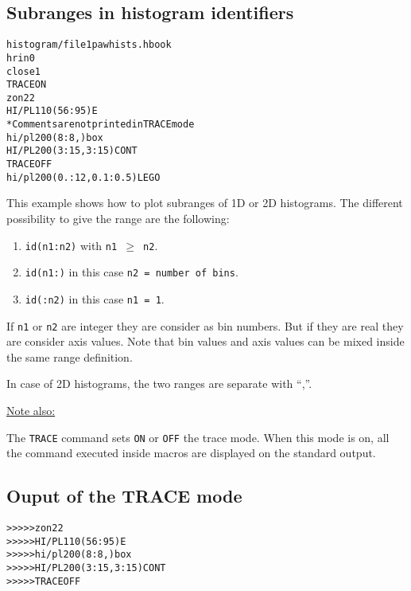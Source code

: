 \clearpage

\subsection{Subranges in histogram identifiers}

\begin{alltt}
      histogram/file 1 pawhists.hbook
      hrin  0
      close 1
     TRACE ON
      zon 2 2
     HI/PL 110(56:95) E
     * Comments are not printed in TRACE mode
      hi/pl 200(8:8,)      box
     HI/PL 200(3:15,3:15) CONT
     TRACE OFF
     hi/pl 200(0.:12,0.1:0.5) LEGO
\end{alltt} 
\begin{DinglistE}
\item This example shows how to plot subranges of 1D or 2D histograms.
      The different possibility to give the range are the following:
\begin{enumerate}
\item  {\tt id(n1:n2)} with {\tt n1 $\geq$ n2}.
\item  {\tt id(n1:)} in this case {\tt n2 = number of bins}.
\item  {\tt id(:n2)} in this case {\tt n1 = 1}.
\end{enumerate}
\item If {\tt n1} or {\tt n2} are integer they are consider as bin
      numbers. But if they are real they are consider axis values.
      Note that bin values and axis values can be mixed inside the
      same range definition.
\item In case of 2D histograms, the two ranges are separate with ``,''.

\underline{Note also:}

\item The {\tt TRACE} command sets {\tt ON} or {\tt OFF} the trace mode.
      When this mode is on, all the command executed inside macros are
      displayed on the standard output.
\begin{center}
\subsection*{Ouput of the TRACE mode}
\begin{alltt}
 >>>>> zon 2 2
 >>>>> HI/PL 110(56:95) E
 >>>>> hi/pl 200(8:8,)      box
 >>>>> HI/PL 200(3:15,3:15) CONT
 >>>>> TRACE OFF
\end{alltt}
\end{center}
\end{DinglistE}

